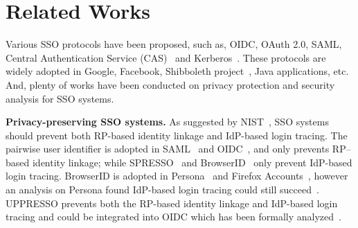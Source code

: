 \section{Related Works}%
\label{sec:related}
Various SSO  protocols have been proposed, such as, OIDC, OAuth 2.0, SAML, Central Authentication Service (CAS)~\cite{aubry2004esup} and Kerberos~\cite{Kerberos}.
These protocols are widely adopted in Google, Facebook, Shibboleth project~\cite{Shibboleth}, Java applications, etc.
And, plenty of works have been conducted on privacy protection and security analysis for SSO systems.


\noindent\textbf{Privacy-preserving SSO systems.}
As suggested by NIST~\cite{NIST2017draft}, SSO systems should prevent both  RP-based identity linkage and IdP-based login tracing.
The pairwise user identifier is adopted in SAML~\cite{SAML} and OIDC~\cite{OpenIDConnect}, and only prevents RP--based identity linkage; while SPRESSO~\cite{SPRESSO} and BrowserID~\cite{BrowserID} only prevent  IdP-based login tracing.
BrowserID is adopted in Persona~\cite{persona} and Firefox Accounts~\cite{FirefoxAccount}, however an analysis on Persona found IdP-based login tracing could still succeed~\cite{FettKS14, BrowserID}.
UPPRESSO prevents both the RP-based identity linkage and IdP-based login tracing and could be integrated into OIDC which has been formally analyzed~\cite{FettKS17}.


